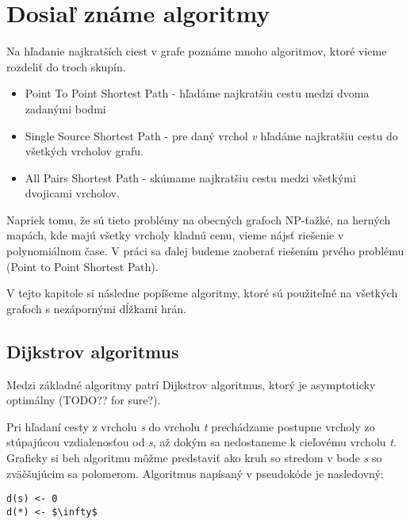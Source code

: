 \chapter{Dosiaľ známe algoritmy}
Na hľadanie najkratších ciest v grafe poznáme mnoho algoritmov, ktoré vieme rozdeliť do troch skupín.


\begin{itemize}
\item Point To Point Shortest Path - hľadáme najkratšiu cestu medzi dvoma zadanými bodmi
\item Single Source Shortest Path - pre daný vrchol {\sl v} hľadáme najkratšiu cestu do všetkých vrcholov grafu.
\item All Pairs Shortest Path - skúmame najkratšiu cestu medzi všetkými dvojicami vrcholov.
\end{itemize}

Napriek tomu, že sú tieto problémy na obecných grafoch NP-ťažké, na herných mapách, kde majú všetky vrcholy kladnú cenu, vieme nájsť riešenie v polynomiálnom čase.
V práci sa ďalej budeme zaoberať riešením prvého problému (Point to Point Shortest Path).

V tejto kapitole si následne popíšeme algoritmy, ktoré sú použiteľné na všetkých grafoch 
s nezápornými dĺžkami hrán.

\section{Dijkstrov algoritmus}
Medzi základné algoritmy patrí Dijkstrov algoritmus, ktorý je asymptoticky optimálny (TODO?? for sure?).

Pri hľadaní cesty z vrcholu {\sl s} do vrcholu {\sl t} prechádzame postupne vrcholy zo stúpajúcou vzdialenosťou od {\sl s}, až dokým sa nedostaneme k cieľovému vrcholu {\sl t}.
Graficky si beh algoritmu môžme predstaviť ako kruh so stredom v bode {\sl s} so zväčšujúcim sa polomerom. Algoritmus napísaný v pseudokóde je nasledovný:

\begin{lstlisting}
d(s) <- 0
d(*) <- $\infty$


\end{lstlisting}



